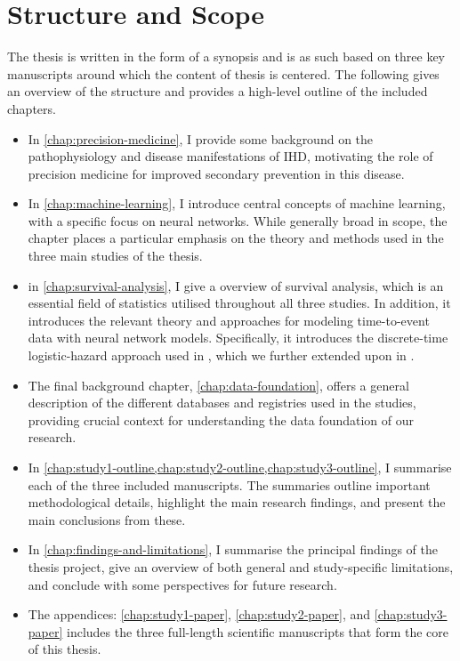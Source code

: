 \newpage
\section*{Structure and Scope}

The thesis is written in the form of a synopsis 
and is as such based on three key manuscripts around 
which the content of thesis is centered.
The following gives an overview of the structure and 
provides a high-level outline of the included chapters.

\begin{itemize} 
    \item In \autoref{chap:precision-medicine},
        I provide some background on the pathophysiology and disease
        manifestations of \ac{IHD}, 
        motivating the role of precision medicine for 
        improved secondary prevention in this disease.

    \item In \autoref{chap:machine-learning}, 
        I introduce central concepts of machine learning, 
        with a specific focus on neural networks. 
        While generally broad in scope, the chapter places a particular 
        emphasis on the theory and methods used in the three main studies of 
        the thesis.

    \item in \autoref{chap:survival-analysis}, I give a
        overview of survival analysis, which is an essential field
        of statistics utilised throughout all three studies.
        In addition, it introduces the relevant theory
        and approaches for modeling time-to-event data
        with neural network models. 
        Specifically, it introduces the 
        discrete-time logistic-hazard approach used in \studyii{},
        which we further extended upon in \studyiii{}.

    \item The final background chapter,
        \autoref{chap:data-foundation}, offers a general description of 
        the different databases and registries used in the studies,
        providing crucial context for understanding the data foundation 
        of our research.

    \item In \cref{chap:study1-outline,chap:study2-outline,chap:study3-outline},
        I summarise each of the three included manuscripts.
        The summaries outline important methodological details,
        highlight the main research findings, and present the main
        conclusions from these.

    \item In \autoref{chap:findings-and-limitations},
        I summarise the principal findings of the thesis project,
        give an overview of both general and study-specific limitations,
        and conclude with some perspectives for future research.

    \item The appendices:
        \cref{chap:study1-paper}, 
        \cref{chap:study2-paper}, and
        \cref{chap:study3-paper} 
        includes the three full-length scientific
        manuscripts that form the core of this thesis.
\end{itemize}

